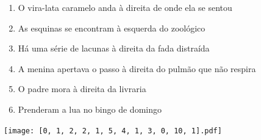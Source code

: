 \documentclass[12pt]{article}
\begin{document}
		 

\pagebreak


	\begin{enumerate}
		  \sffamily %
		  \large %


\vfill \item
O vira-lata caramelo anda	%
à direita
de onde ela se sentou	%

\vfill \item
As esquinas se encontram	%
à esquerda
do zoológico	%

\vfill \item
Há uma série de lacunas	%
à direita
da fada distraída	%

\vfill \item
A menina apertava o passo	%
à direita
do pulmão que não respira	%

\vfill \item
O padre mora	%
à direita
da livraria	%

\vfill \item
Prenderam a lua	%
no bingo de domingo	%
	\end{enumerate}
		  
		  \hfill

		  \vfill

\texttt{[image: [0, 1, 2, 2, 1, 5, 4, 1, 3, 0, 10, 1].pdf]}


	\hfill	  	  


\pagebreak			
\end{document}
